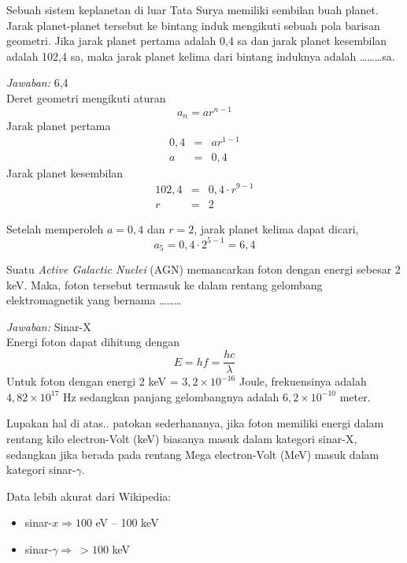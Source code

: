 \documentclass[11pt,fleqn]{exam}
\begin{document}
\begin{questions}
\question Sebuah sistem keplanetan di luar Tata Surya memiliki sembilan buah planet. Jarak planet-planet tersebut ke bintang induk mengikuti sebuah pola barisan geometri. Jika jarak planet pertama adalah 0,4 sa dan jarak planet kesembilan adalah 102,4 sa, maka jarak planet kelima dari bintang induknya adalah \ldots\ldots\ldots sa.

\textit{Jawaban: } 6,4\\

Deret geometri mengikuti aturan
\begin{equation*}
a_n = a r^{n-1}
\end{equation*}
Jarak planet pertama 
\begin{eqnarray*}
0,4 &=& a r^{1-1} \\
a &=& 0,4
\end{eqnarray*}
Jarak planet kesembilan
\begin{eqnarray*}
102,4 &=& 0,4 \cdot r^{9 - 1}\\
r &=& 2
\end{eqnarray*} 

Setelah memperoleh $a = 0,4$ dan $r = 2$, jarak planet kelima dapat dicari,
\begin{equation*}
a_5 = 0,4 \cdot 2^{5-1} = 6,4
\end{equation*}

\question Suatu \textit{Active Galactic Nuclei} (AGN) memancarkan foton dengan energi sebesar 2 keV. Maka, foton tersebut termasuk ke dalam rentang gelombang elektromagnetik yang bernama \ldots\ldots\ldots

\textit{Jawaban: } Sinar-X\\

Energi foton dapat dihitung dengan
\begin{equation}
E = h f = \frac{h c}{\lambda}
\end{equation}
Untuk foton dengan energi 2 keV = $3,2 \times 10^{-16}$ Joule, frekuensinya adalah $4,82 \times 10^{17}$ Hz sedangkan panjang gelombangnya adalah $6,2 \times 10^{-10}$ meter.

Lupakan hal di atas.. patokan sederhananya, jika foton memiliki energi dalam rentang kilo electron-Volt (keV) biasanya masuk dalam kategori sinar-X, sedangkan jika berada pada rentang Mega electron-Volt (MeV) masuk dalam kategori sinar-$\gamma$.

Data lebih akurat dari Wikipedia:
\begin{itemize}
\item sinar-$x \Rightarrow 100$ eV \--- 100 keV
\item sinar-$\gamma \Rightarrow ~> 100$ keV\\
\end{itemize} 


\end{questions}
\end{document}
